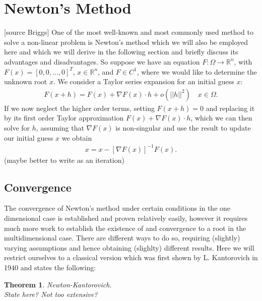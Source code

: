 \documentclass[fleqn, a4paper, 11pt, bibliography=totoc]{report}
\begin{document}
\setlength{\mathindent}{0pt}
\newtheorem{Definition}{Definition}
\newtheorem{Theorem}{Theorem}

\section{Newton's Method}

[source Briggs] One of the most well-known and most commonly used method to solve a non-linear problem is Newton's method which we will also be employed here and which we will derive in the following section and briefly discuss its advantages and disadvantages. So suppose we have an equation
$F : \Omega \rightarrow \mathbb{R}^n$, with $F(x) = [0, 0, ..., 0]^T$, $x \in \mathbb{R}^n$, and $F \in C^1$, where we would like to determine the unknown root $x$. We consider a Taylor series expansion for an initial guess $x$:
\begin{equation}
\begin{aligned}
F(x + h) = F(x) + \nabla F(x) \cdot h + o(||h||^2) \quad x \in \Omega.
\end{aligned}
\end{equation}
If we now neglect the higher order terms, setting $F(x+h) = 0$ and replacing it by its first order Taylor approximation $F(x) + \nabla F(x) \cdot h$, which we can then solve for $h$, assuming that $\nabla F(x)$ is non-singular and use the result to update our initial guess $x$ we obtain 
\begin{equation}
\begin{aligned}
x = x - [\nabla F(x)]^{-1} F(x). 
\end{aligned}
\end{equation}
(maybe better to write as an iteration)

\subsection{Convergence}

The convergence of Newton's method under certain conditions in the one dimensional case is established and proven relatively easily, however it requires much more work to establish the existence of and convergence to a root in the multidimensional case. There are different ways to do so, requiring (slightly) varying assumptions and hence obtaining (slighlty) different results. Here we will restrict ourselves to a classical version which was first shown by L. Kantorovich in 1940 and states the following:

\begin{Theorem}{Newton-Kantorovich.} \\
	State here? Not too extensive? 
\end{Theorem}
\end{document}
